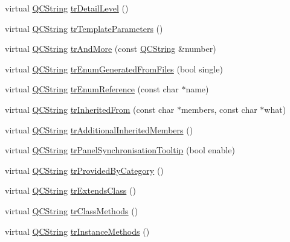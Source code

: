 \begin{DoxyCompactItemize}
\item 
virtual \mbox{\hyperlink{class_q_c_string}{Q\+C\+String}} \mbox{\hyperlink{class_translator_slovak_a5a9359d16b835517e7b9139f53dbc8db}{tr\+Detail\+Level}} ()
\item 
virtual \mbox{\hyperlink{class_q_c_string}{Q\+C\+String}} \mbox{\hyperlink{class_translator_slovak_a1f46e859891bf5d789068c9fe73bb8d3}{tr\+Template\+Parameters}} ()
\item 
virtual \mbox{\hyperlink{class_q_c_string}{Q\+C\+String}} \mbox{\hyperlink{class_translator_slovak_a162e072c2765bc38b29e9986d327e6bc}{tr\+And\+More}} (const \mbox{\hyperlink{class_q_c_string}{Q\+C\+String}} \&number)
\item 
virtual \mbox{\hyperlink{class_q_c_string}{Q\+C\+String}} \mbox{\hyperlink{class_translator_slovak_a6c65e83107c36393bb859837916e1d2e}{tr\+Enum\+Generated\+From\+Files}} (bool single)
\item 
virtual \mbox{\hyperlink{class_q_c_string}{Q\+C\+String}} \mbox{\hyperlink{class_translator_slovak_affe6c1f59e815ca0300f495dc5f346fd}{tr\+Enum\+Reference}} (const char $\ast$name)
\item 
virtual \mbox{\hyperlink{class_q_c_string}{Q\+C\+String}} \mbox{\hyperlink{class_translator_slovak_ad7a9af31583c515678a7c48646384b50}{tr\+Inherited\+From}} (const char $\ast$members, const char $\ast$what)
\item 
virtual \mbox{\hyperlink{class_q_c_string}{Q\+C\+String}} \mbox{\hyperlink{class_translator_slovak_a9de078b3122fe287d5716768249838f0}{tr\+Additional\+Inherited\+Members}} ()
\item 
virtual \mbox{\hyperlink{class_q_c_string}{Q\+C\+String}} \mbox{\hyperlink{class_translator_slovak_ad4e996ad8a81a0cf7899eb0585bd0b2d}{tr\+Panel\+Synchronisation\+Tooltip}} (bool enable)
\item 
virtual \mbox{\hyperlink{class_q_c_string}{Q\+C\+String}} \mbox{\hyperlink{class_translator_slovak_a299aa4af837122aeaf772ee1216469ad}{tr\+Provided\+By\+Category}} ()
\item 
virtual \mbox{\hyperlink{class_q_c_string}{Q\+C\+String}} \mbox{\hyperlink{class_translator_slovak_a6c56fd11337dc4e8557166afc84c4a1e}{tr\+Extends\+Class}} ()
\item 
virtual \mbox{\hyperlink{class_q_c_string}{Q\+C\+String}} \mbox{\hyperlink{class_translator_slovak_afe9dd928ff9ea6a0b7a4b1649638504f}{tr\+Class\+Methods}} ()
\item 
virtual \mbox{\hyperlink{class_q_c_string}{Q\+C\+String}} \mbox{\hyperlink{class_translator_slovak_a3dae7d2d5403edb2eee05d9f545175d6}{tr\+Instance\+Methods}} ()

\end{DoxyCompactItemize}

